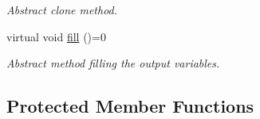 \begin{DoxyCompactItemize}
\begin{DoxyCompactList}\small\item\em Abstract clone method. \end{DoxyCompactList}\item 
\hypertarget{a00318_a26aa352398b544f0a8d0e91acd02a84c}{}virtual void \hyperlink{a00318_a26aa352398b544f0a8d0e91acd02a84c}{fill} ()=0\label{a00318_a26aa352398b544f0a8d0e91acd02a84c}

\begin{DoxyCompactList}\small\item\em Abstract method filling the output variables. \end{DoxyCompactList}\end{DoxyCompactItemize}
\subsection*{Protected Member Functions}
